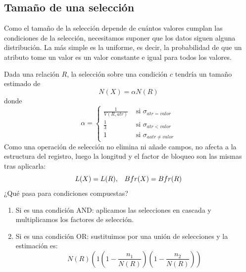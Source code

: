 \subsection{Tamaño de una selección}

Como el tamaño de la selección depende de cuántos valores cumplan las condiciones de la selección, necesitamos suponer que los datos siguen alguna distribución. La más simple es la uniforme, es decir, la probabilidad de que un atributo tome un valor es un valor constante e igual para todos los valores.

Dada una relación $R$, la selección sobre una condición $c$ tendría un tamaño estimado de
\[
N(X)=\alpha N(R)
\]
donde
\[
\alpha = \left\{
\begin{array}{cl}
\frac{1}{V(R,atr)} & \text{ si } \sigma_{atr=valor}\\
\frac{1}{3} & \text{ si }\sigma_{atr<valor}\\
1 & \text{ si }\sigma_{aatr\neq valor}
\end{array}
\right.
\]
Como una operación de selección no elimina ni añade campos, no afecta a la estructura del registro, luego la longitud y el factor de bloqueo son las mismas tras aplicarla:
\[
L(X)=L(R), \;\;\; Bfr(X)=Bfr(R)
\]
¿Qué pasa para condiciones compuestas?
\begin{enumerate}
\item Si es una condición AND: aplicamos las selecciones en cascada y multiplicamos los factores de selección.
\item Si es una condición OR: sustituimos por una unión de selecciones y la estimación es:
\[
N(R)\left(1\left(1-\frac{n_1}{N(R)}\right)\left(1-\frac{n_2}{N(R)}\right)\right)
\]
\end{enumerate}

